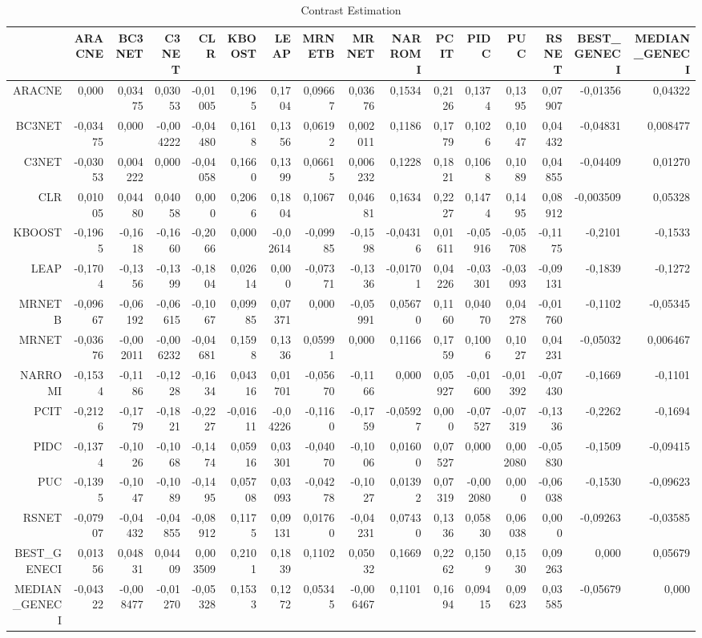 \documentclass[a4paper,10pt]{article}
\begin{document}
\begin{landscape}
\newpage

\begin{table}[!htp]
\centering\tiny
\caption{Contrast Estimation}
\begin{tabular}{
|r|r|r|r|r|r|r|r|r|r|r|r|r|r|r|r|}
\hline
 &ARACNE&BC3NET&C3NET&CLR&KBOOST&LEAP&MRNETB&MRNET&NARROMI&PCIT&PIDC&PUC&RSNET&BEST_GENECI&MEDIAN_GENECI\\
\hline
ARACNE&0,000&0,03475&0,03053&-0,01005&0,1965&0,1704&0,09667&0,03676&0,1534&0,2126&0,1374&0,1395&0,07907&-0,01356&0,04322\\
\hline
BC3NET&-0,03475&0,000&-0,004222&-0,04480&0,1618&0,1356&0,06192&0,002011&0,1186&0,1779&0,1026&0,1047&0,04432&-0,04831&0,008477\\
\hline
C3NET&-0,03053&0,004222&0,000&-0,04058&0,1660&0,1399&0,06615&0,006232&0,1228&0,1821&0,1068&0,1089&0,04855&-0,04409&0,01270\\
\hline
CLR&0,01005&0,04480&0,04058&0,000&0,2066&0,1804&0,1067&0,04681&0,1634&0,2227&0,1474&0,1495&0,08912&-0,003509&0,05328\\
\hline
KBOOST&-0,1965&-0,1618&-0,1660&-0,2066&0,000&-0,02614&-0,09985&-0,1598&-0,04316&0,01611&-0,05916&-0,05708&-0,1175&-0,2101&-0,1533\\
\hline
LEAP&-0,1704&-0,1356&-0,1399&-0,1804&0,02614&0,000&-0,07371&-0,1336&-0,01701&0,04226&-0,03301&-0,03093&-0,09131&-0,1839&-0,1272\\
\hline
MRNETB&-0,09667&-0,06192&-0,06615&-0,1067&0,09985&0,07371&0,000&-0,05991&0,05670&0,1160&0,04070&0,04278&-0,01760&-0,1102&-0,05345\\
\hline
MRNET&-0,03676&-0,002011&-0,006232&-0,04681&0,1598&0,1336&0,05991&0,000&0,1166&0,1759&0,1006&0,1027&0,04231&-0,05032&0,006467\\
\hline
NARROMI&-0,1534&-0,1186&-0,1228&-0,1634&0,04316&0,01701&-0,05670&-0,1166&0,000&0,05927&-0,01600&-0,01392&-0,07430&-0,1669&-0,1101\\
\hline
PCIT&-0,2126&-0,1779&-0,1821&-0,2227&-0,01611&-0,04226&-0,1160&-0,1759&-0,05927&0,000&-0,07527&-0,07319&-0,1336&-0,2262&-0,1694\\
\hline
PIDC&-0,1374&-0,1026&-0,1068&-0,1474&0,05916&0,03301&-0,04070&-0,1006&0,01600&0,07527&0,000&0,002080&-0,05830&-0,1509&-0,09415\\
\hline
PUC&-0,1395&-0,1047&-0,1089&-0,1495&0,05708&0,03093&-0,04278&-0,1027&0,01392&0,07319&-0,002080&0,000&-0,06038&-0,1530&-0,09623\\
\hline
RSNET&-0,07907&-0,04432&-0,04855&-0,08912&0,1175&0,09131&0,01760&-0,04231&0,07430&0,1336&0,05830&0,06038&0,000&-0,09263&-0,03585\\
\hline
BEST_GENECI&0,01356&0,04831&0,04409&0,003509&0,2101&0,1839&0,1102&0,05032&0,1669&0,2262&0,1509&0,1530&0,09263&0,000&0,05679\\
\hline
MEDIAN_GENECI&-0,04322&-0,008477&-0,01270&-0,05328&0,1533&0,1272&0,05345&-0,006467&0,1101&0,1694&0,09415&0,09623&0,03585&-0,05679&0,000\\
\hline


\end{tabular}
\end{table}
\end{landscape}
\end{document}
